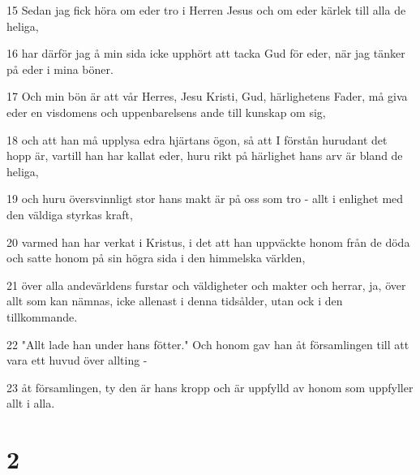 \par 15 Sedan jag fick höra om eder tro i Herren Jesus och om eder kärlek till alla de heliga,
\par 16 har därför jag å min sida icke upphört att tacka Gud för eder, när jag tänker på eder i mina böner.
\par 17 Och min bön är att vår Herres, Jesu Kristi, Gud, härlighetens Fader, må giva eder en visdomens och uppenbarelsens ande till kunskap om sig,
\par 18 och att han må upplysa edra hjärtans ögon, så att I förstån hurudant det hopp är, vartill han har kallat eder, huru rikt på härlighet hans arv är bland de heliga,
\par 19 och huru översvinnligt stor hans makt är på oss som tro - allt i enlighet med den väldiga styrkas kraft,
\par 20 varmed han har verkat i Kristus, i det att han uppväckte honom från de döda och satte honom på sin högra sida i den himmelska världen,
\par 21 över alla andevärldens furstar och väldigheter och makter och herrar, ja, över allt som kan nämnas, icke allenast i denna tidsålder, utan ock i den tillkommande.
\par 22 "Allt lade han under hans fötter." Och honom gav han åt församlingen till att vara ett huvud över allting -
\par 23 åt församlingen, ty den är hans kropp och är uppfylld av honom som uppfyller allt i alla.

\chapter{2}

